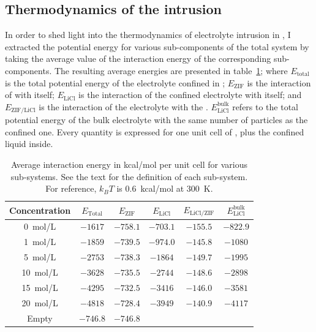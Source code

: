 \documentclass[thesis]{subfiles}
\begin{document}
\subsection{Thermodynamics of the intrusion}

In order to shed light into the thermodynamics of electrolyte intrusion in
, I extracted the potential energy for various sub-components of the total
system by taking the average value of the interaction energy of the
corresponding sub-components. The resulting average energies are presented in
table~\ref{table:thermo:raw}; where $E_\text{total}$ is the total potential
energy of the electrolyte confined in ; $E_\text{ZIF}$ is the interaction
of  with itself; $E_\text{LiCl}$ is the interaction of the confined
electrolyte with itself; and $E_\text{ZIF/LiCl}$ is the interaction of the
electrolyte with the . $E_\text{LiCl}^\text{bulk}$ refers to the total
potential energy of the bulk electrolyte with the same number of particles as
the confined one. Every quantity is expressed for one unit cell of , plus
the confined liquid inside.

\begin{table}[ht]
    \caption{Average interaction energy in kcal/mol per unit cell for various
    sub-systems. See the text for the definition of each sub-system.
    For reference, $k_BT$ is \SI{0.6}{kcal/mol} at \SI{300}{K}.}
    \label{table:thermo:raw}
    \centering
    \renewcommand{\arraystretch}{1.1}
    \begin{tabular}{c c c c c c}
        \toprule
        Concentration  & $E_\text{Total}$ & $E_\text{ZIF}$ & $E_\text{LiCl}$ & $E_\text{LiCl/ZIF}$ & $E_\text{LiCl}^\text{bulk}$ \\
        \midrule
        \SI{0}{mol/L}  &     $-1617$        &    $-758.1$      &   $-703.1$        &     $-155.5$           &   $-822.9$    \\
        \SI{1}{mol/L}  &     $-1859$        &    $-739.5$      &   $-974.0$        &     $-145.8$          &   $-1080$     \\
        \SI{5}{mol/L}  &     $-2753$        &    $-738.3$      &   $-1864$         &     $-149.7$           &   $-1995$     \\
        \SI{10}{mol/L} &     $-3628$        &    $-735.5$      &   $-2744$         &     $-148.6$           &   $-2898$     \\
        \SI{15}{mol/L} &     $-4295$        &    $-732.5$      &   $-3416$         &     $-146.0$           &   $-3581$     \\
        \SI{20}{mol/L} &     $-4818$        &    $-728.4$      &   $-3949$         &     $-140.9$           &   $-4117$     \\
        \bottomrule
        Empty          &     $-746.8$       &    $-746.8$      &                 &                      &             \\
        \bottomrule
    \end{tabular}
\end{table}
\end{document}
